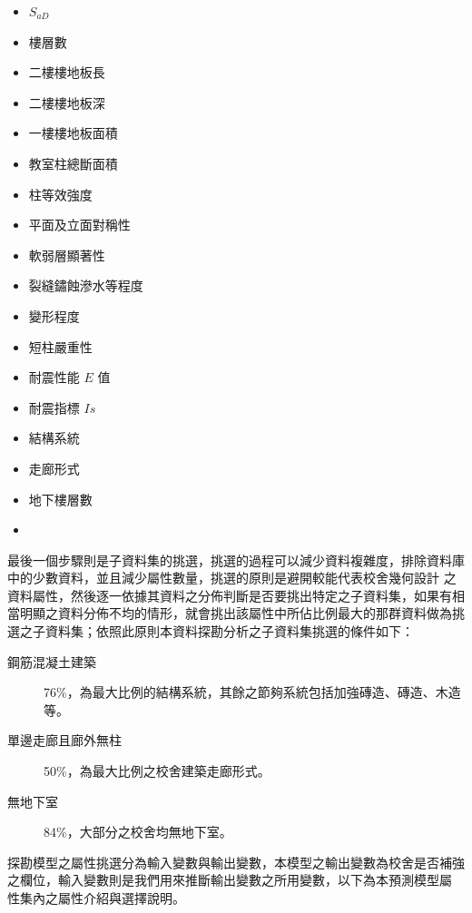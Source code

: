 \begin{multicols}{2}
\begin{itemize}
\item $S_{aD}$
\item 樓層數
\item 二樓樓地板長
\item 二樓樓地板深
\item 一樓樓地板面積
\item 教室柱總斷面積
\item 柱等效強度
\item 平面及立面對稱性
\item 軟弱層顯著性
\item 裂縫鏽蝕滲水等程度
\item 變形程度
\item 短柱嚴重性
\item 耐震性能 $E$ 值
\item 耐震指標 $Is$
\item 結構系統
\item 走廊形式
\item 地下樓層數
\item[]
\end{itemize}
\end{multicols}

最後一個步驟則是子資料集的挑選，挑選的過程可以減少資料複雜度，排除資料庫中的少數資料，並且減少屬性數量，挑選的原則是避開較能代表校舍幾何設計
之資料屬性，然後逐一依據其資料之分佈判斷是否要挑出特定之子資料集，如果有相當明顯之資料分佈不均的情形，就會挑出該屬性中所佔比例最大的那群資料做為挑選之子資料集；依照此原則本資料探勘分析之子資料集挑選的條件如下：

\begin{description}
\item [鋼筋混凝土建築] 76\%，為最大比例的結構系統，其餘之節夠系統包括加強磚造、磚造、木造等。
\item [單邊走廊且廊外無柱] 50\%，為最大比例之校舍建築走廊形式。
\item [無地下室] 84\%，大部分之校舍均無地下室。
\end{description}


探勘模型之屬性挑選分為輸入變數與輸出變數，本模型之輸出變數為校舍是否補強之欄位，輸入變數則是我們用來推斷輸出變數之所用變數，以下為本預測模型屬 性集內之屬性介紹與選擇說明。

